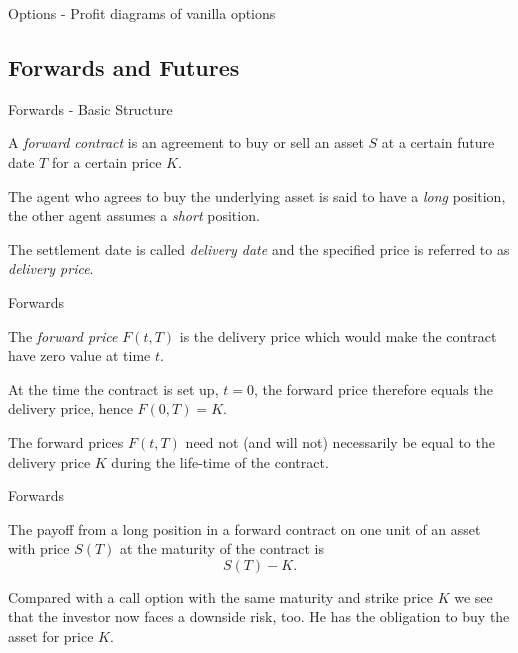 {Options - Profit diagrams of vanilla options}
\begin{figure}
  \centering
   \qquad
\end{figure}

\subsection{Forwards and Futures}

{Forwards - Basic Structure}


	A {\it forward contract}
is an agreement to buy or sell an asset $S$ at a certain future
date $T$ for a certain price $K$.

	The agent who agrees to
buy the underlying asset is said to have a {\it long} position,
the other agent assumes a {\it short} position.

	The settlement
date is called {\it delivery date} and the specified price is
referred to as {\it delivery price}.


{Forwards}


	The {\it forward
price} $F(t,T)$ is the delivery price which would make the
contract have zero value at time $t$.

	At the time the contract is set up, $t=0$,
the forward price therefore equals the delivery price, hence
$F(0,T) = K$.

	The forward prices $F(t,T)$ need not (and will not)
necessarily be equal to the delivery price $K$ during the
life-time of the contract.


{Forwards}


	The payoff from a long position in a forward contract on one unit
of an asset with price $S(T)$ at the maturity of the contract is
$$ S(T)-K.$$

	Compared with a call option with the same maturity
and strike price $K$ we see that the investor now faces a downside
risk, too. He has the obligation to buy the asset for price $K$.

